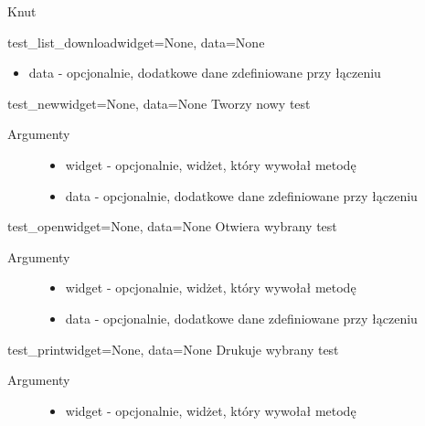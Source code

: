 \documentclass[letterpaper,10pt,polish]{manual}
\begin{document}
\begin{classdesc}{Knut}{}
\begin{methoddesc}{test\_list\_download}{widget=None, data=None}
\begin{description}
\begin{itemize}
\item {} 
data  - opcjonalnie, dodatkowe dane zdefiniowane przy łączeniu

\end{itemize}

\end{description}
\end{methoddesc}

\hypertarget{Knut.Knut.test\_new}{}\begin{methoddesc}{test\_new}{widget=None, data=None}
Tworzy nowy test
\begin{description}
\item[Argumenty] \leavevmode\begin{itemize}
\item {} 
widget - opcjonalnie, widżet, który wywołał metodę

\item {} 
data  - opcjonalnie, dodatkowe dane zdefiniowane przy łączeniu

\end{itemize}

\end{description}
\end{methoddesc}

\hypertarget{Knut.Knut.test\_open}{}\begin{methoddesc}{test\_open}{widget=None, data=None}
Otwiera wybrany test
\begin{description}
\item[Argumenty] \leavevmode\begin{itemize}
\item {} 
widget - opcjonalnie, widżet, który wywołał metodę

\item {} 
data  - opcjonalnie, dodatkowe dane zdefiniowane przy łączeniu

\end{itemize}

\end{description}
\end{methoddesc}

\hypertarget{Knut.Knut.test\_print}{}\begin{methoddesc}{test\_print}{widget=None, data=None}
Drukuje wybrany test
\begin{description}
\item[Argumenty] \leavevmode\begin{itemize}
\item {} 
widget - opcjonalnie, widżet, który wywołał metodę


\end{itemize}
\end{description}
\end{methoddesc}
\end{classdesc}
\end{document}

